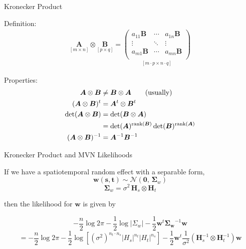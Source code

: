 \documentclass[11pt,ignorenonframetext,]{beamer}
\begin{document}
\begin{frame}{Kronecker Product}

Definition: \[\begin{aligned}
\underset{[m \times n]}{\bm{A}} \otimes \underset{[p \times q]}{\bm{B}} = \underset{[m \cdot p \times  n \cdot q]}{\begin{pmatrix}
a_{11} \bm{B} & \cdots & a_{1n} \bm{B} \\
\vdots        & \ddots & \vdots        \\
a_{m1} \bm{B} & \cdots & a_{mn} \bm{B} \\
\end{pmatrix}}
\end{aligned}\]

\vspace{4mm}

\pause

Properties: \[\begin{aligned}
\bm{A} \otimes \bm{B}       &\ne \bm{B} \otimes \bm{A}  \qquad\text{(usually)} \\
\vspace{3mm}
(\bm{A} \otimes \bm{B})^t   &= \bm{A}^t \otimes \bm{B}^t \\
\vspace{3mm}
\det(\bm{A} \otimes \bm{B}) &= \det(\bm{B} \otimes \bm{A}) \\
&=\det(\bm{A})^{\text{rank}(\bm{B})} \det(\bm{B})^{\text{rank}(\bm{A})} \\
\vspace{3mm}
(\bm{A} \otimes \bm{B})^{-1} &= \bm{A}^{-1} \bm{B}^{-1}
\end{aligned}\]

\end{frame}

\begin{frame}{Kronecker Product and MVN Likelihoods}

If we have a spatiotemporal random effect with a separable form, \[
\bm{w}(\bm{s},\bm{t}) \sim \mathcal{N}(\bm{0},\, \bm\Sigma_w)
\] \[
\bm\Sigma_w = \sigma^2 \, \bm{H}_s \otimes \bm{H}_t
\]

then the likelihood for \(\bm{w}\) is given by

\[
-\frac{n}{2}\log 2\pi - \frac{1}{2} \log |\Sigma_w| - \frac{1}{2} \bm{w}^t \bm{\Sigma_w}^{-1} \bm{w}
\] \[
= -\frac{n}{2}\log 2\pi - \frac{1}{2} \log \left[ (\sigma^2)^{n_t \cdot n_s} |H_s|^{n_t} |H_t|^{n_s}\right] - \frac{1}{2} \bm{w}^t \frac{1}{\sigma^2}(\bm{H}_s^{-1} \otimes \bm{H}_t^{-1}) \bm{w}
\]

\end{frame}
\end{document}
